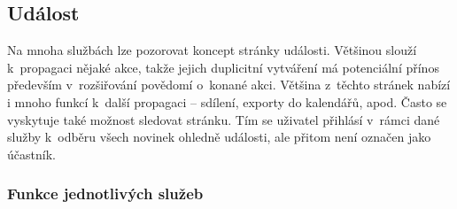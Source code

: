 \documentclass[12pt,oneside,final]{fithesis2}
\begin{document}
\subsection{Událost}\label{eventPage}
Na mnoha službách lze pozorovat koncept stránky události. Většinou slouží k~propagaci nějaké akce, takže jejich duplicitní vytváření má potenciální přínos především v~rozšiřování povědomí o~konané akci. Většina z~těchto stránek nabízí i mnoho funkcí k~další propagaci -- sdílení, exporty do kalendářů, apod. Často se vyskytuje také možnost sledovat stránku. Tím se uživatel přihlásí v~rámci dané služby k~odběru všech novinek ohledně události, ale přitom není označen jako účastník.

\subsubsection*{Funkce jednotlivých služeb}
\end{document}
